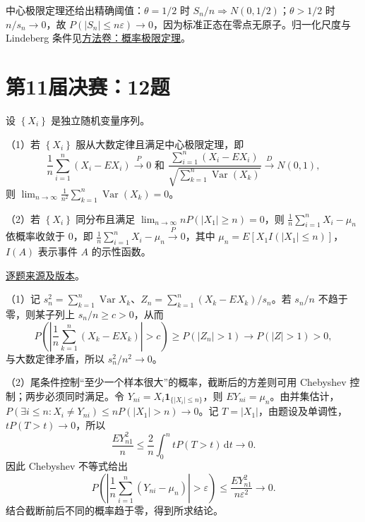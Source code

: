\begin{remark}[方法与条件]

中心极限定理还给出精确阈值：$\theta=1/2$ 时 $S_n/n\Rightarrow N(0,1/2)$；$\theta>1/2$ 时 $n/s_n\to0$，故 $P(|S_n|\leq n\varepsilon)\to0$，因为标准正态在零点无原子。归一化尺度与 Lindeberg 条件见\hyperref[app:probability-limit]{方法卷：概率极限定理}。

\end{remark}

\section{第11届决赛：12题}\label{pr:fin11-high:12}

\begin{example}[公开题解转录]\label{q:fin11-high:12}

设 $\left\{X_{i}\right\}$ 是独立随机变量序列。

（1）若 $\left\{X_{i}\right\}$ 服从大数定律且满足中心极限定理，即
\[
\frac{1}{n}\sum_{i=1}^{n}\left(X_{i}-EX_{i}\right)\overset{P}{\rightarrow}0 \text{ 和 } \frac{\sum_{i=1}^{n}\left(X_{i}-EX_{i}\right)}{\sqrt{\sum_{k=1}^{n}\operatorname{Var}\left(X_{k}\right)}}\overset{D}{\rightarrow}N(0,1),
\]
则 $\lim_{n\to\infty}\frac{1}{n^{2}}\sum_{k=1}^{n}\operatorname{Var}\left(X_{k}\right)=0$。

（2）若 $\left\{X_{i}\right\}$ 同分布且满足 $\lim_{n\to\infty}nP\left(\left|X_{1}\right|\geq n\right)=0$，则 $\frac{1}{n}\sum_{i=1}^{n}X_{i}-\mu_{n}$ 依概率收敛于 0，即 $\frac{1}{n}\sum_{i=1}^{n}X_{i}-\mu_{n}\overset{P}{\rightarrow}0$，其中 $\mu_{n}=E\left[X_{1}I\left(\left|X_{1}\right|\leq n\right)\right]$，$I(A)$ 表示事件 $A$ 的示性函数。

\end{example}

\href{https://github.com/lzxcr/cmc-mathematics/blob/64916fa1fdbc3e444a652eca204d5669058ee321/src/problems/finals/11/14.md}{逐题来源及版本}。

\begin{solve}

（1）记 $s_n^2=\sum_{k=1}^n\operatorname{Var}X_k$、$Z_n=\sum_{k=1}^n(X_k-EX_k)/s_n$。若 $s_n/n$ 不趋于零，则某子列上 $s_n/n\geq c>0$，从而
\[
P\left(\left|\frac1n\sum_{k=1}^n(X_k-EX_k)\right|>c\right)\geq P(|Z_n|>1)\longrightarrow P(|Z|>1)>0,
\]
与大数定律矛盾，所以 $s_n^2/n^2\to0$。

（2）尾条件控制“至少一个样本很大”的概率，截断后的方差则可用 Chebyshev 控制；两步必须同时满足。令 $Y_{ni}=X_i\mathbf1_{\{|X_i|\leq n\}}$，则 $EY_{ni}=\mu_n$。由并集估计，$P(\exists i\leq n:X_i\ne Y_{ni})\leq nP(|X_1|>n)\to0$。记 $T=|X_1|$，由题设及单调性，$tP(T>t)\to0$，所以
\[
\frac{EY_{n1}^2}{n}\leq\frac2n\int_0^ntP(T>t)\,\mathrm dt\longrightarrow0.
\]
因此 Chebyshev 不等式给出
\[
P\left(\left|\frac1n\sum_{i=1}^n(Y_{ni}-\mu_n)\right|>\varepsilon\right)
\leq\frac{EY_{n1}^2}{n\varepsilon^2}\longrightarrow0.
\]
结合截断前后不同的概率趋于零，得到所求结论。

\end{solve}

